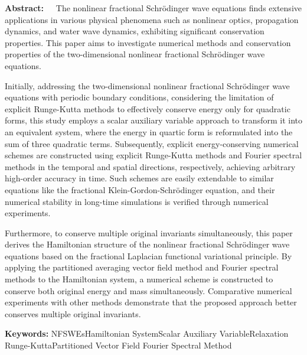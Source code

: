 \begin{EnglishAbstract}
\item {\bf Abstract:\ \ } 
The nonlinear fractional Schr{\"o}dinger wave equations finds extensive applications in various physical phenomena such as nonlinear optics, propagation dynamics, and water wave dynamics, exhibiting significant conservation properties. This paper aims to investigate numerical methods and conservation properties of the two-dimensional nonlinear fractional Schr{\"o}dinger wave equations.

Initially, addressing the two-dimensional nonlinear fractional Schr{\"o}dinger wave equations with periodic boundary conditions, considering the limitation of explicit Runge-Kutta methods to effectively conserve energy only for quadratic forms, this study employs a scalar auxiliary variable approach to transform it into an equivalent system, where the energy in quartic form is reformulated into the sum of three quadratic terms. Subsequently, explicit energy-conserving numerical schemes are constructed using explicit Runge-Kutta methods and Fourier spectral methods in the temporal and spatial directions, respectively, achieving arbitrary high-order accuracy in time. Such schemes are easily extendable to similar equations like the fractional Klein-Gordon-Schr{\"o}dinger equation, and their numerical stability in long-time simulations is verified through numerical experiments.

Furthermore, to conserve multiple original invariants simultaneously, this paper derives the Hamiltonian structure of the nonlinear fractional Schr{\"o}dinger wave equations based on the fractional Laplacian functional variational principle. By applying the partitioned averaging vector field method and Fourier spectral methods to the Hamiltonian system, a numerical scheme is constructed to conserve both original energy and mass simultaneously. Comparative numerical experiments with other methods demonstrate that the proposed approach better conserves multiple original invariants.
\item {\bf Keywords:} NFSWEs\qquad Hamiltonian System\qquad Scalar Auxiliary Variable\qquad Relaxation Runge-Kutta\qquad Partitioned Vector Field \qquad Fourier Spectral Method
\end{EnglishAbstract}